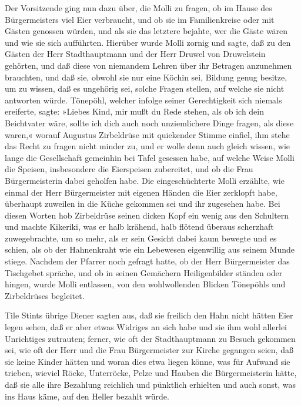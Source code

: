 \pagenum{[28]} Der Vorsitzende ging nun dazu über, die Molli zu
fragen, ob im Hause des Bürgermeisters viel Eier verbraucht, und ob
sie im Familienkreise oder mit Gästen genossen würden, und als sie
das letztere bejahte, wer die Gäste wären und wie sie sich
aufführten. Hierüber wurde Molli zornig und sagte, daß zu den
Gästen der Herr Stadthauptmann und der Herr Druwel von Druwelstein
gehörten, und daß diese von niemandem Lehren über ihr Betragen
anzunehmen brauchten, und daß sie, obwohl sie nur eine Köchin sei,
Bildung genug besitze, um zu wissen, daß es ungehörig sei, solche
Fragen stellen, auf welche sie nicht antworten würde. Tönepöhl,
welcher infolge seiner Gerechtigkeit sich niemals ereiferte, sagte:
»Liebes Kind, mir mußt du Rede stehen, als ob ich dein Beichtvater
wäre, sollte ich dich auch noch unziemlichere Dinge fragen, als
diese waren,« worauf Augustus Zirbeldrüse mit quiekender Stimme
einfiel, ihm stehe das Recht zu fragen nicht minder zu, und er
wolle denn auch gleich wissen, wie lange die Gesellschaft gemeinhin
bei Tafel gesessen habe, auf welche Weise Molli die Speisen,
insbesondere die Eierspeisen zubereitet, und ob die Frau
Bürgermeisterin dabei geholfen habe. Die eingeschüchterte Molli
erzählte, wie einmal der Herr Bürgermeister mit eigenen Händen die
Eier zerklopft habe, überhaupt zuweilen in die Küche gekommen sei
und ihr zugesehen habe. Bei diesen Worten hob Zirbeldrüse seinen
dicken Kopf ein wenig aus den Schultern und machte Kikeriki, was er
halb krähend, halb flötend überaus scherzhaft zuwegebrachte, um so
mehr, als er sein Gesicht dabei kaum bewegte und es schien, als ob
der Hahnenkraht wie ein Lebewesen eigenwillig aus seinem Munde
stiege. Nachdem der Pfarrer noch gefragt hatte, ob der Herr
Bürgermeister das Tischgebet \pagenum{[29]} spräche, und ob in
seinen Gemächern Heiligenbilder ständen oder hingen, wurde Molli
entlassen, von den wohlwollenden Blicken Tönepöhls und Zirbeldrüses
begleitet.

Tile Stints übrige Diener sagten aus, daß sie freilich den Hahn
nicht hätten Eier legen sehen, daß er aber etwas Widriges an sich
habe und sie ihm wohl allerlei Unrichtiges zutrauten; ferner, wie
oft der Stadthauptmann zu Besuch gekommen sei, wie oft der Herr und
die Frau Bürgermeister zur Kirche gegangen seien, daß sie keine
Kinder hätten und woran dies etwa liegen könne, was für Aufwand sie
trieben, wieviel Röcke, Unterröcke, Pelze und Hauben die
Bürgermeisterin hätte, daß sie alle ihre Bezahlung reichlich und
pünktlich erhielten und auch sonst, was ins Haus käme, auf den
Heller bezahlt würde.

